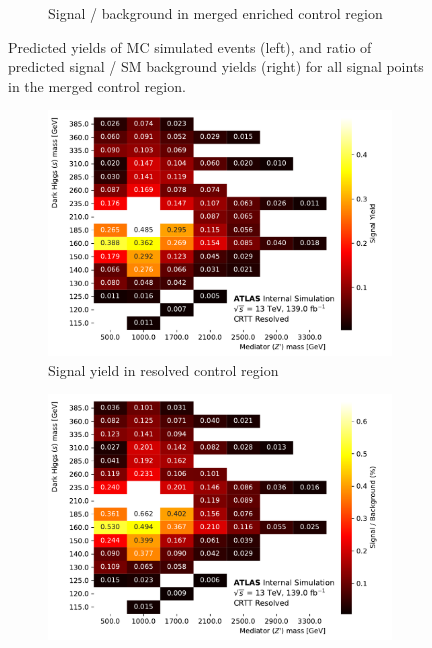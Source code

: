 \begin{figure}[htbp]
\begin{subfigure}{0.45\textwidth}
    \caption{Signal / background in merged \ttbar enriched control region}
    \label{fig:signal_over_bkg_CRTT_merged_CR}
    \end{subfigure}
  \caption[Signal contaminations in merged SR and CRTT]{Predicted yields of MC simulated events (left), and ratio of predicted signal / SM background yields (right) for all signal points in the merged \ttbar control region.}
  \label{fig:signal_composition_CRTT_merged}
\end{figure}

\begin{figure}[htbp]
  \centering
  \begin{subfigure}{0.45\textwidth}
    \includegraphics[width=\textwidth]{Figures/5/SignalYields_CRTT_Resolved.pdf}
    \caption{Signal yield in resolved \ttbar control region}
    \label{fig:signal_yield_CRTT_resolved_CR}
    \end{subfigure} \hspace{1em}
  \begin{subfigure}{0.45\textwidth}
    \includegraphics[width=\textwidth]{Figures/5/SignalContaminations_CRTT_Resolved.pdf}

\end{subfigure}
\end{figure}
